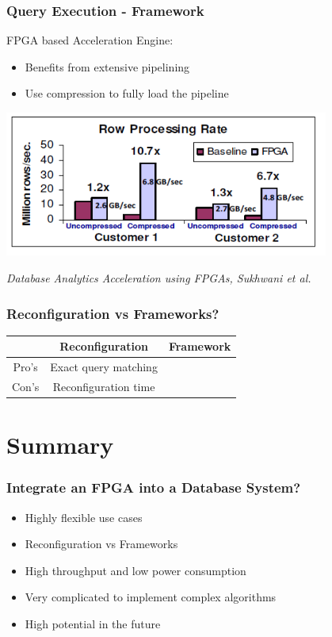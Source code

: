 \documentclass{beamer}
\begin{document}
\begin{frame}
	\frametitle{Query Execution - Framework}
	FPGA based Acceleration Engine:
	\begin{itemize}
		\item Benefits from extensive pipelining
		\item Use compression to fully load the pipeline
	\end{itemize}
	
	\begin{center}
		\includegraphics[width=0.8\textwidth]{img/engine_eval.png}
	\end{center}

	\begin{center}
		\small \emph{Database Analytics Acceleration using FPGAs, Sukhwani et al.}
	\end{center}
\end{frame}

\begin{frame}
\frametitle{Reconfiguration vs Frameworks?}
\begin{center}
	\begin{tabular}{| c | c | c |}
		\hline
		& Reconfiguration & Framework \\ \hline
		Pro's & Exact query matching & \\ \hline
		Con's & Reconfiguration time & \\ \hline
	\end{tabular}
\end{center}

\end{frame}

\section{Summary}
\begin{frame}
	\frametitle{Integrate an FPGA into a Database System?}
	\begin{itemize}
		\item Highly flexible use cases
		\item Reconfiguration vs Frameworks
		\item High throughput and low power consumption
		\item Very complicated to implement complex algorithms
		\item High potential in the future
	\end{itemize}
\end{frame}
\end{document}

